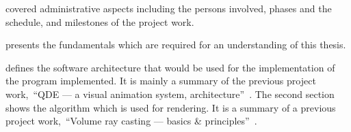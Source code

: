 \documentclass[%
    a4paper,    %
    justified,  %
    nobib,      %
    openany     %
]{tufte-book}
\begin{document}

 covered administrative aspects including the
persons involved, phases and the schedule, and milestones of the project work.

 presents the fundamentals which are required for
an understanding of this thesis.

 defines the software architecture
that would be used for the implementation of the program implemented. It is
mainly a summary of the previous project work,~\enquote{QDE --- a visual
animation system, architecture}~\cite{osterwalder-qde-2016}. The second section
shows the algorithm which is used for rendering. It is a summary of a previous
project work,~\enquote{Volume ray casting --- basics \&
principles}~\cite{osterwalder-volume-2016}.
\end{document}
